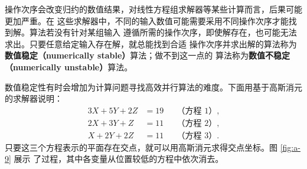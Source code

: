 操作次序会改变归约的数值结果，对线性方程组求解器等某些计算而言，后果可能更加严重。在
这些求解器中，不同的输入数值可能需要采用不同操作次序才能找到解。算法若没有针对某组输入
遵循所需的操作次序，即使解存在，也可能无法求出。只要任意给定输入存在解，就总能找到合适
操作次序并求出解的算法称为\textbf{数值稳定（numerically stable）}算法；做不到这一点的
算法称为\textbf{数值不稳定（numerically unstable）}算法。

数值稳定性有时会增加为计算问题寻找高效并行算法的难度。下面用基于高斯消元的求解器说明：
\[
\begin{aligned}
  3X+5Y+2Z&=19 &&\text{（方程 1）},\\
  2X+3Y+Z&=11 &&\text{（方程 2）},\\
  X+2Y+2Z&=11 &&\text{（方程 3）}.
\end{aligned}
\]
只要这三个方程表示的平面存在交点，就可以用高斯消元求得交点坐标。图 \ref{fig:a-9} 展示
了过程，其中各变量从位置较低的方程中依次消去。

